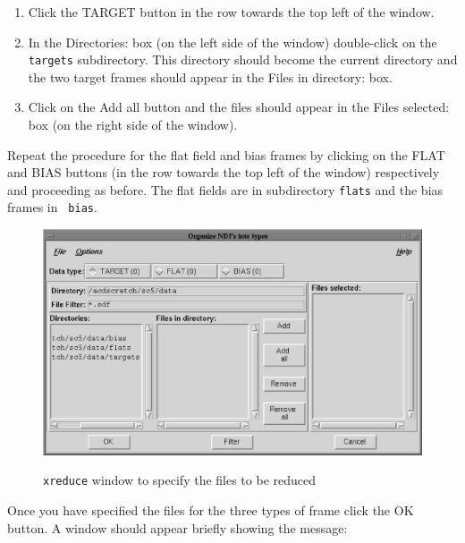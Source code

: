 \documentclass[twoside,11pt]{article}
\begin{document}
\begin{enumerate}
  \begin{enumerate}

    \item Click the {\sf TARGET} button in the row towards the top left
     of the window.

    \item In the {\sf Directories:} box (on the left side of the window)
     double-click on the {\tt targets} subdirectory.  This directory
     should become the current directory and the two target frames should
     appear in the {\sf Files in directory:} box.

    \item Click on the {\sf Add all} button and the files should appear
     in the {\sf Files selected:} box (on the right side of the window).

  \end{enumerate}

   Repeat the procedure for the flat field and bias frames by clicking
   on the {\sf FLAT} and {\sf BIAS} buttons (in the row towards the top
   left of the window) respectively and proceeding as before.  The flat
   fields are in subdirectory {\tt flats} and the bias frames in {\tt
   bias}.

  \begin{figure}[htbp]
     \centering 
      \includegraphics[totalheight=3in]{sc5_organisendftypes.ps}
      \begin{quote}
      \caption{{\tt xreduce} window to specify the files to be reduced
      \label{ORGANISENDFTYPES} }
      \end{quote}
  \end{figure}

   Once you have specified the files for the three types of frame click
   the {\sf OK} button.  A window should appear briefly showing the message:


\end{enumerate}
\end{document}

